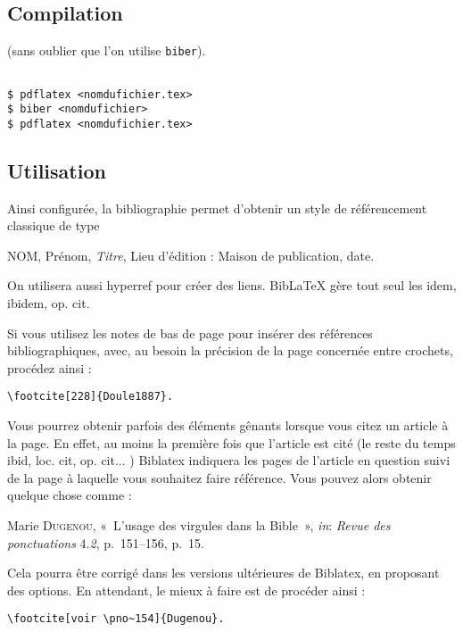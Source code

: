 \documentclass[10pt,a4paper]{article}
\begin{document}
\subsection{Compilation}

(sans oublier que l'on utilise \verb!biber!).
\begin{Verbatim}[frame=single, framerule=0.2mm, rulecolor=\color{gray}, label=Compilation avec la biblio]

$ pdflatex <nomdufichier.tex>
$ biber <nomdufichier>
$ pdflatex <nomdufichier.tex>

\end{Verbatim}

\subsection{Utilisation}

Ainsi configurée, la bibliographie permet d'obtenir un style de référencement classique de type 
\begin{center}
NOM, Prénom, \textit{Titre}, Lieu d'édition : Maison de publication, date. 
\end{center}

On utilisera aussi hyperref pour créer des liens. BibLaTeX gère tout seul les idem, ibidem, op. cit.

Si vous utilisez les notes de bas de page pour insérer des références bibliographiques, avec, au besoin la précision de la page concernée entre crochets, procédez ainsi : 

\begin{Verbatim}[frame=single, framerule=0.2mm, rulecolor=\color{gray}]
\footcite[228]{Doule1887}.
\end{Verbatim}

Vous pourrez obtenir parfois des éléments gênants lorsque vous citez un article à la page. En effet, au moins la première fois que l'article est cité (le reste du temps ibid, loc. cit, op. cit... ) Biblatex indiquera les pages de l'article en question suivi de la page à laquelle vous souhaitez faire référence. Vous pouvez alors obtenir quelque chose comme :

Marie \textsc{Dugenou}, «~L'usage des virgules dans la Bible~», \textit{in}: \textit{Revue des ponctuations} 4.\textit{2}, p.~151--156, p.~15.

Cela pourra être corrigé dans les versions ultérieures de Biblatex, en proposant des options. En attendant, le mieux à faire est de procéder ainsi :

\begin{Verbatim}[frame=single, framerule=0.2mm, rulecolor=\color{gray}]
\footcite[voir \pno~154]{Dugenou}.
\end{Verbatim}
\end{document}

